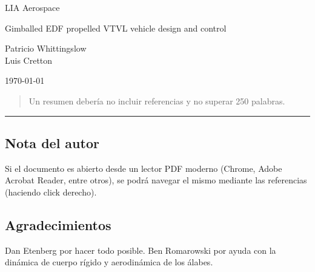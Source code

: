 \documentclass[11pt, titlepage]{article}
\author{Patricio Whittingslow \and Luis Cretton}
\begin{document}
\begin{titlepage}
	
	\centering
	{\small LIA Aerospace \par}
	
	
	\vspace{8cm}
	{\Huge Gimballed EDF propelled VTVL vehicle design and control  \par}
	\vspace{2cm}
	{ \large {
			Patricio Whittingslow \\ Luis Cretton 
		\par}}
	\vspace{4cm}
	\today
	
\end{titlepage}

\begin{abstract}
	Un resumen debería no incluir referencias y no superar 250 palabras.
\end{abstract}

\newpage
\tableofcontents
\newpage
\printunsrtglossaries
\vfill
\hrule
\vspace{-1cm}
\subsection*{Nota del autor}
Si el documento es abierto desde un lector PDF moderno (Chrome, Adobe Acrobat Reader, entre otros), se podrá navegar el mismo mediante las referencias (haciendo click derecho).
\newpage








\subsection*{Agradecimientos}
Dan Etenberg por hacer todo posible. Ben Romarowski por ayuda con la dinámica de cuerpo rígido y aerodinámica de los álabes.




% 
%
\end{document}
